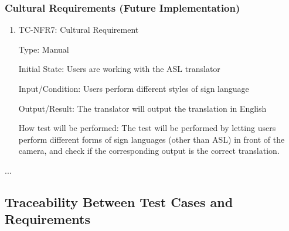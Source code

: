 \documentclass[12pt]{article}
\begin{document}
\subsubsection{Cultural Requirements (Future Implementation)}

\begin{enumerate}

\item{TC-NFR7: Cultural Requirement\\}

Type: Manual

Initial State: Users are working with the ASL translator
					
Input/Condition: Users perform different styles of sign language 
					
Output/Result: The translator will output the translation in English
					
How test will be performed: The test will be performed by letting users perform different forms of sign languages (other than ASL) in front of the camera, and check if the corresponding output is the correct translation.

\end{enumerate}

...

\subsection{Traceability Between Test Cases and Requirements}
\end{document}
